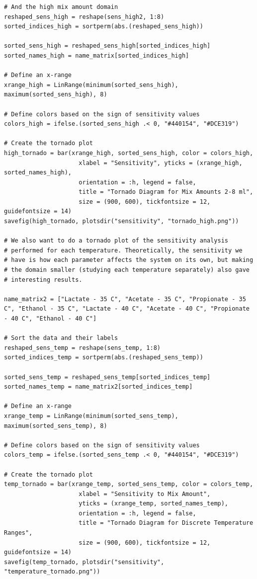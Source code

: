 \documentclass[11pt]{article}
\begin{document}
\begin{verbatim}
# And the high mix amount domain
reshaped_sens_high = reshape(sens_high2, 1:8)
sorted_indices_high = sortperm(abs.(reshaped_sens_high))

sorted_sens_high = reshaped_sens_high[sorted_indices_high]
sorted_names_high = name_matrix[sorted_indices_high]

# Define an x-range
xrange_high = LinRange(minimum(sorted_sens_high), maximum(sorted_sens_high), 8)

# Define colors based on the sign of sensitivity values
colors_high = ifelse.(sorted_sens_high .< 0, "#440154", "#DCE319")

# Create the tornado plot
high_tornado = bar(xrange_high, sorted_sens_high, color = colors_high,
                     xlabel = "Sensitivity", yticks = (xrange_high, sorted_names_high),
                     orientation = :h, legend = false,
                     title = "Tornado Diagram for Mix Amounts 2-8 ml",
                     size = (900, 600), tickfontsize = 12, guidefontsize = 14)
savefig(high_tornado, plotsdir("sensitivity", "tornado_high.png"))

# We also want to do a tornado plot of the sensitivity analysis
# performed for each temperature. Theoretically, the sensitivity we
# have is how each parameter affects the system on its own, but making
# the domain smaller (studying each temperature separately) also gave
# interesting results.

name_matrix2 = ["Lactate - 35 C", "Acetate - 35 C", "Propionate - 35 C", "Ethanol - 35 C", "Lactate - 40 C", "Acetate - 40 C", "Propionate - 40 C", "Ethanol - 40 C"]

# Sort the data and their labels
reshaped_sens_temp = reshape(sens_temp, 1:8)
sorted_indices_temp = sortperm(abs.(reshaped_sens_temp))

sorted_sens_temp = reshaped_sens_temp[sorted_indices_temp]
sorted_names_temp = name_matrix2[sorted_indices_temp]

# Define an x-range
xrange_temp = LinRange(minimum(sorted_sens_temp), maximum(sorted_sens_temp), 8)

# Define colors based on the sign of sensitivity values
colors_temp = ifelse.(sorted_sens_temp .< 0, "#440154", "#DCE319")

# Create the tornado plot
temp_tornado = bar(xrange_temp, sorted_sens_temp, color = colors_temp,
                     xlabel = "Sensitivity to Mix Amount",
                     yticks = (xrange_temp, sorted_names_temp),
                     orientation = :h, legend = false,
                     title = "Tornado Diagram for Discrete Temperature Ranges",
                     size = (900, 600), tickfontsize = 12, guidefontsize = 14)
savefig(temp_tornado, plotsdir("sensitivity", "temperature_tornado.png"))
\end{verbatim}
\end{document}

